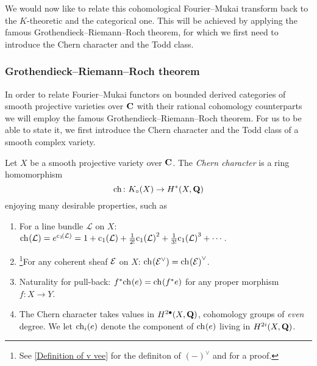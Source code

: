 We would now like to relate this cohomological Fourier--Mukai transform back to the $K$-theoretic and the categorical one. This will be achieved by applying the famous Grothendieck--Riemann--Roch theorem, 
for which we first need to introduce the Chern character and the Todd class. 

\subsubsection*{Grothendieck--Riemann--Roch theorem}

In order to relate Fourier--Mukai functors on bounded derived categories of smooth projective varieties over $\mathbf C$ with their rational cohomology counterparts we will employ the famous Grothendieck--Riemann--Roch theorem. For us to be able to state it, we first introduce the Chern character and the Todd class of a smooth complex variety.

\begin{definition}
    \label{Definition of Chern character}
    Let $X$ be a smooth projective variety over $\mathbf C$. The \emph{Chern character} is a ring homomorphism
    \[
        \ch[] \colon \kgroup{X} \to \cohom{*}{X}{\Q}
    \] 
    enjoying many desirable properties, such as
    \begin{enumerate}[label = (\roman*)]
        \item{For a line bundle $\mathcal L$ on $X$: $\ch[](\mathcal L) = e^{\cclass[1]{\mathcal L}} = 1 + \cclass[1]{\mathcal L} + \frac{1}{2!}\cclass[1]{\mathcal L}^2 + \frac{1}{3!}\cclass[1]{\mathcal L}^3 + \cdots$.
        } \label{chern character on line bundle}
        \item{\footnote{
            See \ref{Definition of v vee} for the definiton of $(-)^\vee$ and \cite[Lemma C.7]{vanBree2020} for a proof.
        }For any coherent sheaf $\mathcal E$ on $X$: $\ch[]{\E^\vee} = \ch[]{\E}^\vee$.} \label{chern character and dual}
        \item{Naturality for pull-back: $f^*\ch[]{e} = \ch[]{f^*e}$ for any proper morphism $f \colon X \to Y$.}
        \item{The Chern character takes values in $H^{2\bullet}(X, \mathbf Q)$, \ie cohomology groups of \emph{even} degree. We let $\ch[i](e)$ denote the component of $\ch[]{e}$ living in $H^{2i}(X, \mathbf Q)$.}
    \end{enumerate} 
\end{definition}

